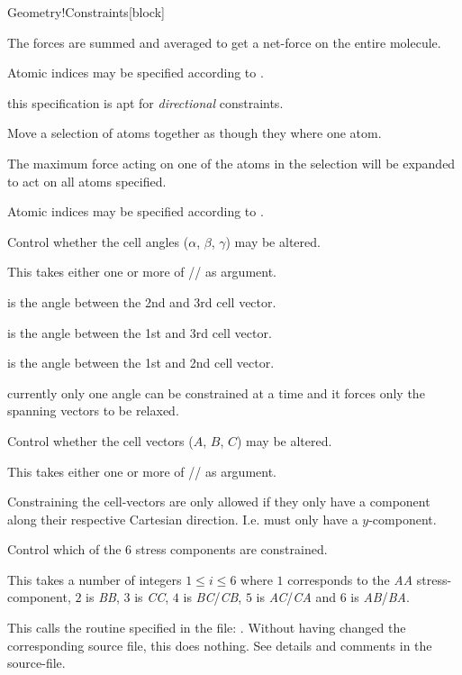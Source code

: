 \begin{fdfentry}{Geometry!Constraints}[block]
\begin{fdfoptions}
    The forces are summed and averaged to get a net-force on the
    entire molecule.

    Atomic indices may be specified according to .

    \note this specification is apt for \emph{directional}
    constraints. 


    Move a selection of atoms together as though they where one atom.

    The maximum force acting on one of the atoms in the selection will
    be expanded to act on all atoms specified.

    Atomic indices may be specified according to .



    Control whether the cell angles ($\alpha$, $\beta$, $\gamma$) may
    be altered.

    This takes either one or more of
    // as argument.

     is the angle between the 2nd and 3rd cell vector.

     is the angle between the 1st and 3rd cell vector.

     is the angle between the 1st and 2nd cell vector.

    \note currently only one angle can be constrained at a time and it
    forces only the spanning vectors to be relaxed.


    Control whether the cell vectors ($A$, $B$, $C$) may be altered.

    This takes either one or more of // as
    argument.

    Constraining the cell-vectors are only allowed if they only have a
    component along their respective Cartesian
    direction. I.e.  must only have a $y$-component.


    \option[stress]%
    Control which of the 6 stress components are constrained.

    This takes a number of integers $1\le i\le6$ where $1$ corresponds
    to the \emph{AA} stress-component, $2$ is \emph{BB}, $3$ is
    \emph{CC}, $4$ is \emph{BC}/\emph{CB}, $5$ is \emph{AC}/\emph{CA}
    and $6$ is \emph{AB}/\emph{BA}.

    \option[routine]%
    This calls the  routine specified in the file:
    . Without having changed the corresponding source
    file, this does nothing.
    See details and comments in the source-file.



\end{fdfoptions}
\end{fdfentry}
